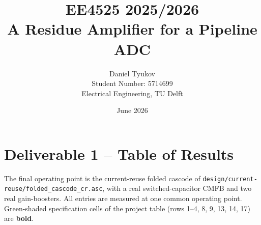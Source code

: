 \documentclass[11pt]{article}
\title{EE4525 2025/2026 \\ A Residue Amplifier for a Pipeline ADC}
\author{Daniel Tyukov \\ Student Number: 5714699 \\ Electrical Engineering, TU Delft}
\date{June 2026}
\begin{document}
\maketitle
\tableofcontents
\clearpage

\section{Deliverable 1 -- Table of Results}
The final operating point is the current-reuse folded cascode of
\texttt{design/current-reuse/folded\_cascode\_cr.asc}, with a real switched-capacitor
CMFB and two real gain-boosters. All entries are measured at one common operating point.
Green-shaded specification cells of the project table (rows 1--4, 8, 9, 13, 14, 17) are
\textbf{bold}.
\end{document}
